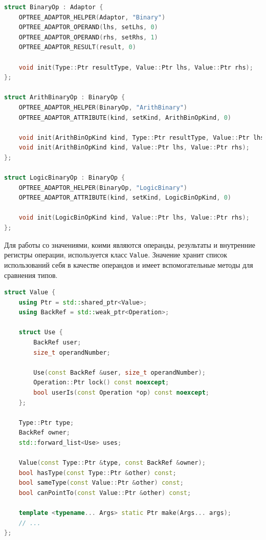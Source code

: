 \clearpage

\begin{lstlisting}[language=C++, caption=Объявление адаптеров для бинарных операций]
struct BinaryOp : Adaptor {
    OPTREE_ADAPTOR_HELPER(Adaptor, "Binary")
    OPTREE_ADAPTOR_OPERAND(lhs, setLhs, 0)
    OPTREE_ADAPTOR_OPERAND(rhs, setRhs, 1)
    OPTREE_ADAPTOR_RESULT(result, 0)

    void init(Type::Ptr resultType, Value::Ptr lhs, Value::Ptr rhs);
};

struct ArithBinaryOp : BinaryOp {
    OPTREE_ADAPTOR_HELPER(BinaryOp, "ArithBinary")
    OPTREE_ADAPTOR_ATTRIBUTE(kind, setKind, ArithBinOpKind, 0)

    void init(ArithBinOpKind kind, Type::Ptr resultType, Value::Ptr lhs, Value::Ptr rhs);
    void init(ArithBinOpKind kind, Value::Ptr lhs, Value::Ptr rhs);
};

struct LogicBinaryOp : BinaryOp {
    OPTREE_ADAPTOR_HELPER(BinaryOp, "LogicBinary")
    OPTREE_ADAPTOR_ATTRIBUTE(kind, setKind, LogicBinOpKind, 0)

    void init(LogicBinOpKind kind, Value::Ptr lhs, Value::Ptr rhs);
};
\end{lstlisting}

Для работы со значениями, коими являются операнды, результаты и внутренние регистры операции, используется класс \verb|Value|.
Значение хранит список использований себя в качестве операндов и имеет вспомогательные методы для сравнения типов.

\begin{lstlisting}[language=C++, caption=Объявление класса значения]
struct Value {
    using Ptr = std::shared_ptr<Value>;
    using BackRef = std::weak_ptr<Operation>;

    struct Use {
        BackRef user;
        size_t operandNumber;

        Use(const BackRef &user, size_t operandNumber);
        Operation::Ptr lock() const noexcept;
        bool userIs(const Operation *op) const noexcept;
    };

    Type::Ptr type;
    BackRef owner;
    std::forward_list<Use> uses;

    Value(const Type::Ptr &type, const BackRef &owner);
    bool hasType(const Type::Ptr &other) const;
    bool sameType(const Value::Ptr &other) const;
    bool canPointTo(const Value::Ptr &other) const;

    template <typename... Args> static Ptr make(Args... args);
    // ...
};
\end{lstlisting}

